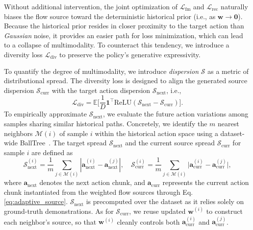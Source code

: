 Without additional intervention, the joint optimization of $\mathcal{L}_{\mathrm{fm}}$ and $\mathcal{L}_{\mathrm{rec}}$ naturally biases the flow source toward the deterministic historical prior (i.e., as $\mathbf{w} \to \mathbf{0}$). Because the historical prior resides in closer proximity to the target action than \textit{Gaussian} noise, it provides an easier path for loss minimization, which can lead to a collapse of multimodality. To counteract this tendency, we introduce a diversity loss $\mathcal{L}_{\mathrm{div}}$ to preserve the policy's generative expressivity.

To quantify the degree of multimodality, we introduce \textit{dispersion} $\mathcal{S}$ as a metric of distributional spread. The diversity loss is designed to align the generated source dispersion $\mathcal{S}_{\mathrm{curr}}$ with the target action dispersion $\mathcal{S}_{\mathrm{next}}$, i.e.,
\begin{equation}
\mathcal{L}_{\mathrm{div}} = \mathbb{E} \bigl[\frac{1}{D}\mathbf{1}^\top\mathrm{ReLU}(\mathcal{S}_{\mathrm{next}} - \mathcal{S}_{\mathrm{curr}})\bigr].
\label{eq:diversity_loss}
\end{equation}
To empirically approximate $\mathcal{S}_{\mathrm{next}}$, we evaluate the future action variations among samples sharing similar historical paths. Concretely, we identify the $m$ nearest neighbors $\mathcal{M}(i)$ of sample $i$ within the historical action space using a dataset-wide BallTree~\citep{scikit-learn}. The target spread $\mathcal{S}_{\mathrm{next}}$ and the current source spread $\mathcal{S}_{\mathrm{curr}}$ for sample $i$ are defined as
\begin{equation}
\mathcal{S}_{\mathrm{next}}^{(i)} = \frac{1}{m}\sum_{j\in\mathcal{M}(i)}|\mathbf{a}_{\mathrm{next}}^{(i)} - \mathbf{a}_{\mathrm{next}}^{(j)}|, \quad
\mathcal{S}_{\mathrm{curr}}^{(i)} = \frac{1}{m}\sum_{j\in\mathcal{M}(i)}\bigl|\mathbf{a}_{\mathrm{curr}}^{(i)} - \mathbf{a}_{\mathrm{curr}}^{(j)}\bigr|,
\label{eq:target_spread}
\end{equation}
where $\mathbf{a}_{\mathrm{next}}$ denotes the next action chunk, and $\mathbf{a}_{\mathrm{curr}}$ represents the current action chunk instantiated from the weighted flow sources through Eq. \eqref{eq:adaptive_source}. $\mathcal{S}_{\mathrm{next}}$ is precomputed over the dataset as it relies solely on ground-truth demonstrations. As for $\mathcal{S}_{\mathrm{curr}}$, we reuse updated $\mathbf{w}^{(i)}$ to construct each neighbor's source, so that $\mathbf{w}^{(i)}$ cleanly controls both $\mathbf{a}_{\mathrm{curr}}^{(i)}$ and $\mathbf{a}_{\mathrm{curr}}^{(j)}$.


